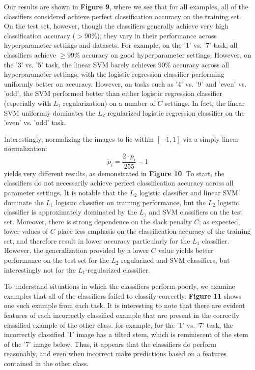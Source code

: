 \documentclass[10pt,psamsfonts]{amsart}
\theoremstyle{definition}
\theoremstyle{remark}
\numberwithin{equation}{section}
\begin{document}
Our results are shown in {\bf Figure 9}, where we see that for all examples, all of the classifiers considered achieve perfect classification accuracy on the training set. On the test set, however, though the classifiers generally achieve very high classification accuracy ($> 90\%$), they vary in their performance across hyperparameter settings and datasets. For example, on the '1' vs. '7' task, all classifiers achieve $\geq 99\%$ accuracy on good hyperparameter settings. However, on the '3' vs. '5' task, the linear SVM barely achieves $90\%$ accuracy across all hyperparameter settings, with the logistic regression classifier performing uniformly better on accuracy. However, on tasks such as '4' vs. '9' and 'even' vs. 'odd', the SVM performed better than either logistic regression classifier (especially with $L_1$ regularization) on a number of $C$ settings. In fact, the linear SVM uniformly dominates the $L_2$-regularized logistic regression classifier on the 'even' vs. 'odd' task.

Interestingly, normalizing the images to lie within $[-1,1]$ via a simply linear normalization:
$$\tilde{p}_i = \frac{2\cdot p_i}{255} - 1$$
yields very different results, as demonstrated in {\bf Figure 10}. To start, the classifiers do not necessarily achieve perfect classification accuracy across all parameter settings. It is notable that the $L_2$ logistic classifier and linear SVM dominate the $L_1$ logistic classifier on training performance, but the $L_2$ logistic classifier is approximately dominated by the $L_1$ and SVM classifiers on the test set. Moreover, there is strong dependence on the slack penalty $C$; as expected, lower values of $C$ place less emphasis on the classification accuracy of the training set, and therefore result in lower accuracy particularly for the $L_1$ classifier. However, the generalization provided by a lower $C$ value yields better performance on the test set for the $L_2$-regularized and SVM classifiers, but interestingly not for the $L_1$-regularized classifier.

To understand situations in which the classifiers perform poorly, we examine examples that all of the classifiers failed to classify correctly. {\bf Figure 11} shows one such example from each task. It is interesting to note that there are evident features of each incorrectly classified example that are present in the correctly classified example of the other class. for example, for the '1' vs. '7' task, the incorrectly classified '1' image has a tilted stem, which is reminiscent of the stem of the '7' image below. Thus, it appears that the classifiers do perform reasonably, and even when incorrect make predictions based on a features contained in the other class. 
\end{document}
